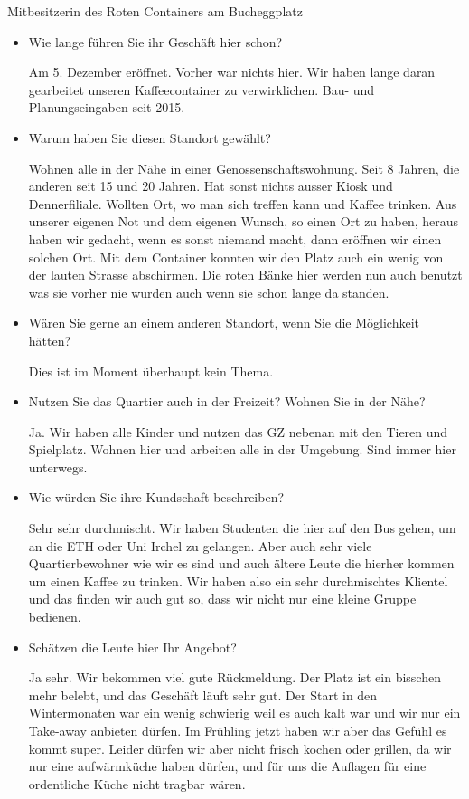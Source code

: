\documentclass[a4paper,ngerman,11pt]{scrartcl}
\begin{document}
Mitbesitzerin des Roten Containers am Bucheggplatz

\begin{itemize}
\item Wie lange führen Sie ihr Geschäft hier schon?

Am 5. Dezember eröffnet. Vorher war nichts hier. Wir haben lange daran
gearbeitet unseren Kaffeecontainer zu verwirklichen. Bau- und
Planungseingaben seit 2015.

\item Warum haben Sie diesen Standort gewählt?

Wohnen alle in der Nähe in einer Genossenschaftswohnung. Seit 8 Jahren, die
anderen seit 15 und 20 Jahren. Hat sonst nichts ausser Kiosk und
Dennerfiliale. Wollten Ort, wo man sich treffen kann und Kaffee trinken. Aus
unserer eigenen Not und dem eigenen Wunsch, so einen Ort zu haben, heraus
haben wir gedacht, wenn es sonst niemand macht, dann eröffnen wir einen
solchen Ort. Mit dem Container konnten wir den Platz auch ein wenig von der
lauten Strasse abschirmen. Die roten Bänke hier werden nun auch benutzt was
sie vorher nie wurden auch wenn sie schon lange da standen.

\item Wären Sie gerne an einem anderen Standort, wenn Sie die Möglichkeit hätten?

Dies ist im Moment überhaupt kein Thema.

\item Nutzen Sie das Quartier auch in der Freizeit? Wohnen Sie in der Nähe?

Ja. Wir haben alle Kinder und nutzen das GZ nebenan mit den Tieren und
Spielplatz. Wohnen hier und arbeiten alle in der Umgebung. Sind immer hier
unterwegs.

\item Wie würden Sie ihre Kundschaft beschreiben?

Sehr sehr durchmischt. Wir haben Studenten die hier auf den Bus gehen, um an
die ETH oder Uni Irchel zu gelangen. Aber auch sehr viele Quartierbewohner
wie wir es sind und auch ältere Leute die hierher kommen um einen Kaffee zu
trinken. Wir haben also ein sehr durchmischtes Klientel und das finden wir
auch gut so, dass wir nicht nur eine kleine Gruppe bedienen.

\item Schätzen die Leute hier Ihr Angebot?

Ja sehr. Wir bekommen viel gute Rückmeldung. Der Platz ist ein bisschen mehr
belebt, und das Geschäft läuft sehr gut. Der Start in den Wintermonaten war
ein wenig schwierig weil es auch kalt war und wir nur ein Take-away anbieten
dürfen. Im Frühling jetzt haben wir aber das Gefühl es kommt super. Leider
dürfen wir aber nicht frisch kochen oder grillen, da wir nur eine
aufwärmküche haben dürfen, und für uns die Auflagen für eine ordentliche
Küche nicht tragbar wären.


\end{itemize}
\end{document}
